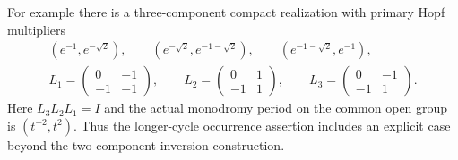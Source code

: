 \begin{proposition}
For example there is a three-component compact
realization with primary Hopf multipliers
\[
 \begin{gathered}
 (e^{-1},e^{-\sqrt2}),\qquad
 (e^{-\sqrt2},e^{-1-\sqrt2}),\qquad
 (e^{-1-\sqrt2},e^{-1}),\\
 L_1=\begin{pmatrix}0&-1\\-1&-1\end{pmatrix},\qquad
 L_2=\begin{pmatrix}0&1\\-1&1\end{pmatrix},\qquad
 L_3=\begin{pmatrix}0&-1\\-1&1\end{pmatrix}.
 \end{gathered}
 \tag{C.HG.1}\label{cdp:eq:C.HG.1}
\]
Here $L_3L_2L_1=I$ and the actual monodromy period
on the common open group is $(t^{-2},t^2)$.
Thus the longer-cycle occurrence assertion includes
an explicit case beyond the two-component inversion
construction.
\end{proposition}

